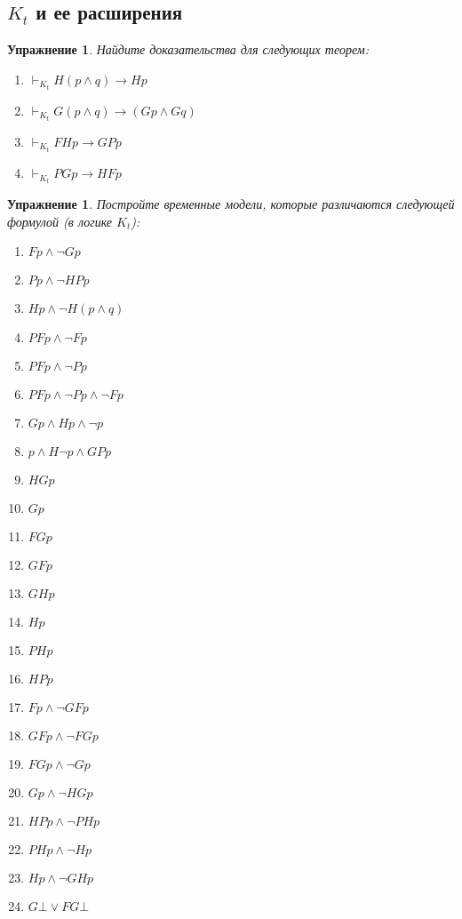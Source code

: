 \documentclass[11pt]{article}
\newtheorem{exercise}[theorem]{Упражнение}
\begin{document}
\subsection{$K_t$ и ее расширения}
\begin{exercise} Найдите доказательства для следующих теорем:
\begin{multicols}{2}
\begin{enumerate}
	\item $\vdash_{K_t} H (p \wedge q) \to Hp$
	\item $\vdash_{K_t} G (p \wedge q) \to (G p \wedge Gq)$
	\item $\vdash_{K_t} FHp \to GPp$
	\item $\vdash_{K_t} PGp \to HFp$
\end{enumerate}
\end{multicols}
\end{exercise}


\begin{exercise} Постройте временные модели, которые различаются следующей формулой (в логике $K_t$): 
\begin{multicols}{3}
\begin{enumerate}
\item $Fp \wedge \neg Gp$
\item $Pp \wedge \neg HPp$
\item $Hp \wedge \neg H (p \wedge q)$
\item $PFp \wedge \neg Fp$
\item $PFp \wedge \neg Pp$
\item $PFp \wedge \neg Pp \wedge \neg Fp$
\item $Gp \wedge Hp \wedge \neg p$	
\item $p \wedge H \neg p \wedge GPp$
\item $HGp$
\item $Gp$
\item $FGp$
\item $GFp$
\item $GHp$
\item $Hp$
\item $PHp$
\item $HPp$
\item $Fp \wedge \neg GFp$
\item $GFp \wedge \neg FGp$
\item $FGp \wedge \neg Gp$
\item $Gp \wedge \neg HGp$
\item $HPp \wedge \neg PHp$
\item $PH p \wedge \neg Hp$
\item $Hp \wedge \neg GHp$
\item $G \bot \vee FG\bot $
\end{enumerate}
\end{multicols}
\end{exercise}
\end{document}
